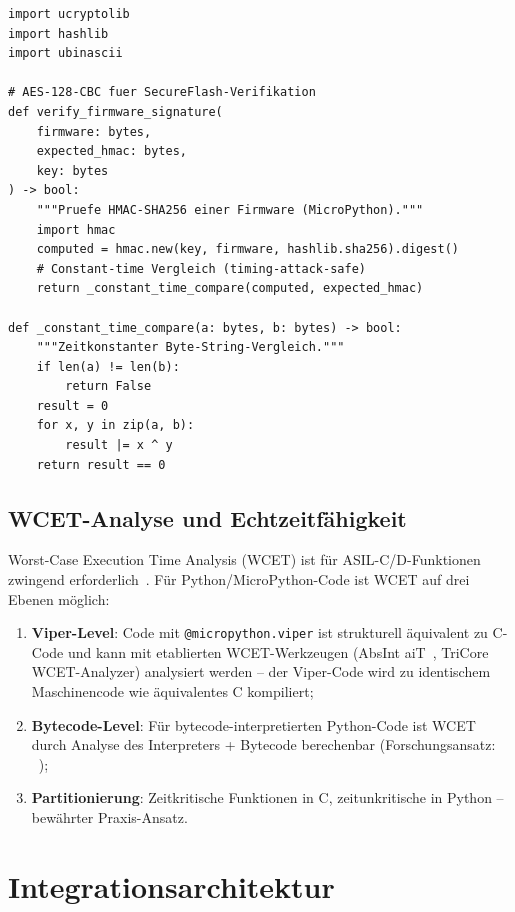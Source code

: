 ﻿\documentclass[12pt,a4paper,twoside]{article}
\begin{document}
\begin{lstlisting}[language=MicroPython,caption={Sicherheits-relevante Kryptographie in MicroPython},label=lst:crypto]
import ucryptolib
import hashlib
import ubinascii

# AES-128-CBC fuer SecureFlash-Verifikation
def verify_firmware_signature(
    firmware: bytes,
    expected_hmac: bytes,
    key: bytes
) -> bool:
    """Pruefe HMAC-SHA256 einer Firmware (MicroPython)."""
    import hmac
    computed = hmac.new(key, firmware, hashlib.sha256).digest()
    # Constant-time Vergleich (timing-attack-safe)
    return _constant_time_compare(computed, expected_hmac)

def _constant_time_compare(a: bytes, b: bytes) -> bool:
    """Zeitkonstanter Byte-String-Vergleich."""
    if len(a) != len(b):
        return False
    result = 0
    for x, y in zip(a, b):
        result |= x ^ y
    return result == 0
\end{lstlisting}

\subsection{WCET-Analyse und Echtzeitfähigkeit}
\label{subsec:wcet}

Worst-Case Execution Time Analysis (WCET) ist für ASIL-C/D-Funktionen
zwingend erforderlich~\cite{wilhelm2008wcet}.
Für Python/MicroPython-Code ist WCET auf drei Ebenen möglich:

\begin{enumerate}
  \item \textbf{Viper-Level}: Code mit \texttt{@micropython.viper} ist
        strukturell äquivalent zu C-Code und kann mit etablierten
        WCET-Werkzeugen (AbsInt aiT~\cite{absint_ait}, TriCore WCET-Analyzer)
        analysiert werden -- der Viper-Code wird zu identischem Maschinencode
        wie äquivalentes C kompiliert;
  \item \textbf{Bytecode-Level}: Für bytecode-interpretierten Python-Code
        ist WCET durch Analyse des Interpreters + Bytecode berechenbar
        (Forschungsansatz: ~\cite{micropython_wcet2023});
  \item \textbf{Partitionierung}: Zeitkritische Funktionen in C, zeitunkritische
        in Python -- bewährter Praxis-Ansatz.
\end{enumerate}

\section{Integrationsarchitektur}
\label{sec:architektur}
\end{document}
